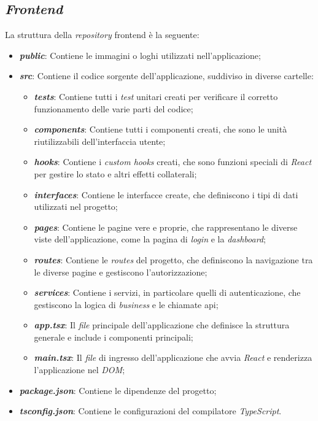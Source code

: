 \subsection{\textit{Frontend}}
\label{sez:frontend}

La struttura della \textit{repository} \gls{frontend} è la seguente:

\begin{itemize}
    \item \textbf{\textit{public}}: Contiene le immagini o loghi utilizzati nell'applicazione;
    \item \textbf{\textit{src}}: Contiene il codice sorgente dell'applicazione, suddiviso in diverse cartelle:
    \begin{itemize}
        \item \textbf{\textit{tests}}: Contiene tutti i \textit{test} unitari creati per verificare il corretto funzionamento delle varie parti del codice;
        \item \textbf{\textit{components}}: Contiene tutti i componenti creati, che sono le unità riutilizzabili dell'interfaccia utente;
        \item \textbf{\textit{hooks}}: Contiene i \textit{custom hooks} creati, che sono funzioni speciali di \textit{React} per gestire lo stato e altri effetti collaterali;
        \item \textbf{\textit{interfaces}}: Contiene le interfacce create, che definiscono i tipi di dati utilizzati nel progetto;
        \item \textbf{\textit{pages}}: Contiene le pagine vere e proprie, che rappresentano le diverse viste dell'applicazione, come la pagina di \textit{login} e la \textit{dashboard};
        \item \textbf{\textit{routes}}: Contiene le \textit{routes} del progetto, che definiscono la navigazione tra le diverse pagine e gestiscono l'autorizzazione;
        \item \textbf{\textit{services}}: Contiene i servizi, in particolare quelli di autenticazione, che gestiscono la logica di \textit{business} e le chiamate \gls{api};
        \item \textbf{\textit{app.tsx}}: Il \textit{file} principale dell'applicazione che definisce la struttura generale e include i componenti principali;
        \item \textbf{\textit{main.tsx}}: Il \textit{file} di ingresso dell'applicazione che avvia \textit{React} e renderizza l'applicazione nel \textit{DOM};
    \end{itemize}
    \item \textbf{\textit{package.json}}: Contiene le dipendenze del progetto;
    \item \textbf{\textit{tsconfig.json}}: Contiene le configurazioni del compilatore \textit{TypeScript}.
\end{itemize}

